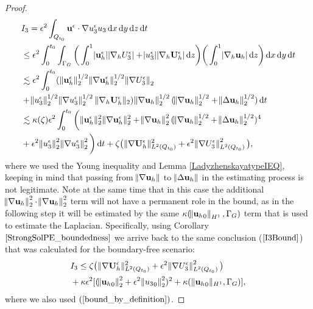 \documentclass[12pt]{report}
\numberwithin{theorem}{chapter}
\numberwithin{corollary}{chapter}
\numberwithin{lemma}{chapter}
\numberwithin{remark}{chapter}
\numberwithin{definition}{chapter}
\numberwithin{prop}{chapter}
\newcommand*\diff{\mathop{}\!\mathrm{d}}
\begin{document}
\begin{proof}
  \begin{equation}
    \begin{split}
      & I_3 = \epsilon^2 \int_{Q_{t_0}} \mathbf{u}^\epsilon \cdot \nabla u_3^\epsilon u_3 \diff x \diff y \diff z \diff t \\
      & \leq \epsilon^2 \int_0^{t_0} \int_{\Gamma_G} \bigg ( \int_0^1 \abs{\mathbf{u}_h^\epsilon} \abs{\nabla_h U_3^\epsilon} + \abs{u_3^\epsilon} \abs{\nabla_h \mathbf{U}_h^\epsilon}\diff z \bigg) \bigg ( \int_0^1 \abs{\nabla_h \mathbf{u}_h}  \diff z \bigg ) \diff x \diff y \diff t \\
      & \lesssim \epsilon^2 \int_0^{t_0} ( \| \mathbf{u}_h^\epsilon \| _2^{1/2} \| \nabla\mathbf{u}_h^\epsilon \| _2^{1/2} \norm{\nabla U_3^\epsilon}_2 \\
      & + \norm{u_3^\epsilon}_2^{1/2} \norm{\nabla u_3^\epsilon}_2^{1/2} \| \nabla_h \mathbf{U}_h^\epsilon \|_2) \norm{\nabla \mathbf{u}_h }_2^{1/2} (\norm{\nabla \mathbf{u}_h}_2^{1/2} + \norm{\Delta \mathbf{u}_h}_2^{1/2}) \diff t \\
      & \lesssim \kappa(\zeta) \epsilon^2 \int_0 ^ {t_0} \bigg ( \| \mathbf{u}_h^\epsilon \| _2^2 \| \nabla \mathbf{u}_h^\epsilon \|_2^2 + \norm{\nabla \mathbf{u}_h}_2^2 (\norm{\nabla \mathbf{u}_h}_2^{1/2} + \norm{\Delta \mathbf{u}_h}_2^{1/2})^4 \\
      & + \epsilon^2 \norm{u_3^\epsilon}_2^2 \norm{\nabla u_3^\epsilon}_2^2 \bigg ) \diff t + \zeta \big ( \| \nabla \mathbf{U}_h^\epsilon \|_{L^2(Q_{t_0})}^2 + \epsilon^2 \norm{\nabla U_3^\epsilon}_{L^2(Q_{t_0})}^2  \big),\raisetag{40pt}
    \end{split}
  \end{equation}
%
where we used the Young inequality and Lemma \ref{LadyzhenskayatypeIEQ}, keeping in mind that passing from $\norm{\nabla \mathbf{u}_h}$ to $\norm{\Delta \mathbf{u}_h}$ in the estimating process is not legitimate. Note at the same time that in this case the additional $\norm{\nabla \mathbf{u}_h}_2^2 \cdot \norm{\nabla \mathbf{u}_h}_2^2$ term will not have a permanent role in the bound, as in the following step it will be estimated by the same $\kappa (\norm{{\mathbf{u}_h}_0}_{H^1}, \Gamma_G)$ term that is used to estimate the Laplacian. Specifically, using Corollary $\ref{StrongSolPE_boundedness}$ we arrive back to the same conclusion ($\ref{I3Bound}$) that was calculated for the boundary-free scenario:
%
  \begin{equation} \label{I3Bound}
    \begin{split}
      & I_3 \leq \zeta \big (  \| \nabla \mathbf{U}_h^\epsilon \| _{L^2(Q_{t_0})}^2 + \epsilon^2 \norm{\nabla U_3^\epsilon}_{L^2(Q_{t_0})}^2 \big )\\
      & + \kappa \epsilon^2 [(\norm{{\mathbf{u}_h}_0}_2^2 + \epsilon^2 \norm{{u_3}_0}_2^2)^2 + \kappa( \| {\mathbf{u}_h}_0 \| _{H^1}, \Gamma_G)],
    \end{split}
  \end{equation}
%
where we also used $(\ref{bound_by_definition})$.


\end{proof}
\end{document}
